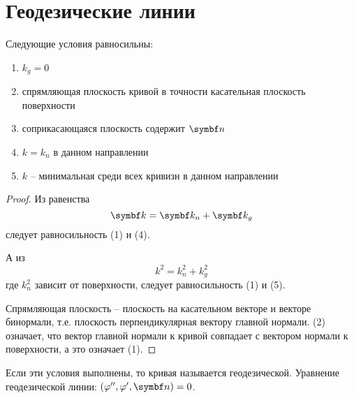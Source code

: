 \documentclass[main]{subfiles}
\begin{document}
\chapter{Геодезические линии}
\begin{theorem}
    Следующие условия равносильны:
    \begin{enumerate}
        \item $k_g = 0$
        \item спрямляющая плоскость кривой в точности касательная плоскость поверхности
        \item соприкасающаяся плоскость содержит $\vn$
        \item $k = k_n$ в данном направлении
        \item $k$ -- минимальная среди всех кривизн в данном направлении
    \end{enumerate}
\end{theorem}
\begin{proof}
    Из равенства
    \[\vk = \vk_n + \vk_g\]
    следует равносильность (1) и (4).

    А из
    \[k^2 = k^2_n + k^2_g\]
    где $k^2_n$ зависит от поверхности, следует равносильность (1) и (5).

    Спрямляющая плоскость -- плоскость на касательном векторе и векторе бинормали,
    т.е. плоскость перпендикулярная вектору главной нормали.
    (2) означает, что вектор главной нормали к кривой совпадает с вектором нормали к поверхности, а это означает (1).
\end{proof}
\begin{definition}
    Если эти условия выполнены, то кривая называется геодезической.
    Уравнение геодезической линии: $(\phi'', \phi', \vn) = 0$.
\end{definition}
\end{document}
